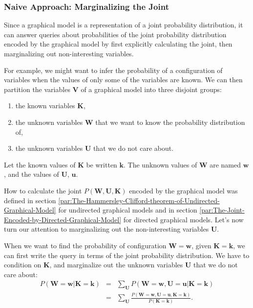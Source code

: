 \subsubsection{Naive Approach: Marginalizing the Joint \label{par:Exact-Inference-in-Directed-and-Undirected Graphical Models}}

Since a graphical model is a representation of a joint probability
distribution, it can answer queries about probabilities of the joint
probability distribution encoded by the graphical model by first explicitly
calculating the joint, then marginalizing out non-interesting variables.

For example, we might want to infer the probability of a configuration
of variables when the values of only some of the variables are known.
We can then partition the variables $\mathbf{V}$ of a graphical model
into three disjoint groups:
\begin{enumerate}
\item the known variables $\mathbf{K}$,
\item the unknown variables $\mathbf{W}$ that we want to know the probability
distribution of,
\item the unknown variables $\mathbf{U}$ that we do not care about.
\end{enumerate}
Let the known values of $\mathbf{K}$ be written \textbf{$\mathbf{k}$}.
The unknown values of $\mathbf{W}$ are named \textbf{$\mathbf{w}$},
and the values of $\mathbf{U}$, $\mathbf{u}$. 

How to calculate the joint $P(\mathbf{W},\mathbf{U},\mathbf{K})$
encoded by the graphical model was defined in section \ref{par:The-Hammersley-Clifford-theorem-of-Undirected-Graphical-Model}
for undirected graphical models and in section \ref{par:The-Joint-Encoded-by-Directed-Graphical-Model}
for directed graphical models. Let's now turn our attention to marginalizing
out the non-interesting variables $\mathbf{U}$.

When we want to find the probability of configuration $\mathbf{W}=\mathbf{w}$,
given $\mathbf{K}=\mathbf{k}$, we can first write the query in terms
of the joint probability distribution. We have to condition on $\mathbf{K}$,
and marginalize out the unknown variables $\mathbf{U}$ that we do
not care about: 
\begin{eqnarray}
P(\mathbf{W}=\mathbf{w}|\mathbf{K}=\mathbf{k}) & = & \sum_{\mathbf{U}}P(\mathbf{W}=\mathbf{w},\mathbf{U}=\mathbf{u}|\mathbf{K}=\mathbf{k})\nonumber \\
 & = & \sum_{\mathbf{U}}\frac{P(\mathbf{W}=\mathbf{w},\mathbf{U}=\mathbf{u},\mathbf{K}=\mathbf{k})}{P(\mathbf{K}=\mathbf{k})}.\label{eq:Inference in graphical models}
\end{eqnarray}

